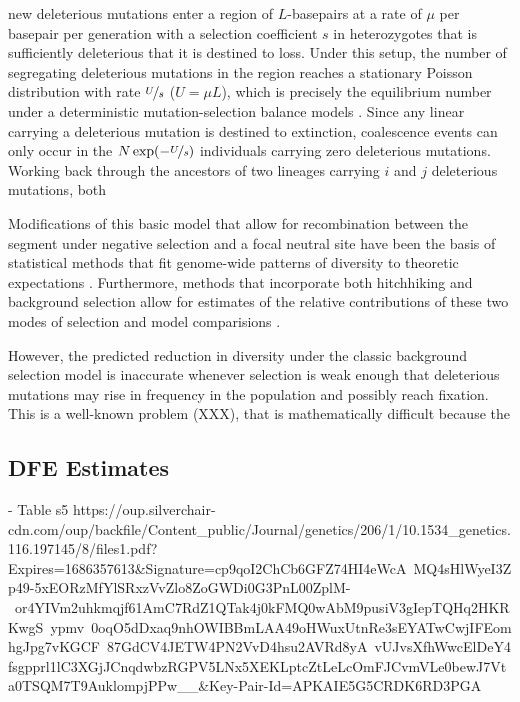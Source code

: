 \documentclass[11pt]{article}
\begin{document}
new deleterious mutations enter a region of $L$-basepairs at a rate of $\mu$
per basepair per generation with a selection coefficient $s$ in heterozygotes
that is sufficiently deleterious that it is destined to loss. Under this setup,
the number of segregating deleterious mutations in the region reaches a
stationary Poisson distribution with rate $\nicefrac{U}{s}$ ($U=\mu L$), which
is precisely the equilibrium number under a deterministic mutation-selection
balance models \parencite{Kimura1966-bk,Crow1970-wj}. Since any linear carrying
a deleterious mutation is destined to extinction, coalescence events can only
occur in the $N \exp(-\nicefrac{U}{s})$ individuals carrying zero deleterious
mutations. Working back through the ancestors of two lineages carrying $i$ and
$j$ deleterious mutations, both 


Modifications of this basic model that allow for recombination between the
segment under negative selection and a focal neutral site
\parencite{Nordborg1996-nq,Hudson1994-oh} have been the basis of statistical
methods that fit genome-wide patterns of diversity to theoretic expectations
\parencite{McVicker2009-ax,Hudson1995-xc}. Furthermore, methods that
incorporate both hitchhiking and background selection allow for estimates of
the relative contributions of these two modes of selection and model
comparisions \parencite{Elyashiv2016-vt,Murphy2022-sj}.

However, the predicted reduction in diversity under the classic background
selection model is inaccurate whenever selection is weak enough that
deleterious mutations may rise in frequency in the population and possibly
reach fixation. This is a well-known problem (XXX), that is mathematically
difficult because the 

\subsection*{DFE Estimates}
 - Table s5 https://oup.silverchair-cdn.com/oup/backfile/Content_public/Journal/genetics/206/1/10.1534_genetics.116.197145/8/files1.pdf?Expires=1686357613&Signature=cp9qoI2ChCb6GFZ74HI4eWcA~MQ4sHlWyeI3Zp49-5xEORzMfYlSRxzVvZlo8ZoGWDi0G3PnL00ZplM-~or4YIVm2uhkmqjf61AmC7RdZ1QTak4j0kFMQ0wAbM9pusiV3gIepTQHq2HKRKwgS~ypmv~0oqO5dDxaq9nhOWIBBmLAA49oHWuxUtnRe3sEYATwCwjIFEomhgJpg7vKGCF~87GdCV4JETW4PN2VvD4hsu2AVRd8yA~vUJvsXfhWwcElDeY4fsgpprl1lC3XGjJCnqdwbzRGPV5LNx5XEKLptcZtLeLcOmFJCvmVLe0bewJ7Vta0TSQM7T9AuklompjPPw__&Key-Pair-Id=APKAIE5G5CRDK6RD3PGA
\end{document}

